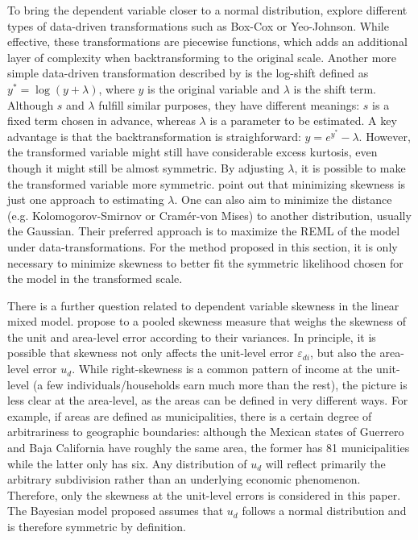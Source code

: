 To bring the dependent variable closer to a normal distribution, \cite{rojas_perilla_data_2020} explore different types of data-driven transformations such as Box-Cox or Yeo-Johnson.
While effective, these transformations are piecewise functions, which adds an additional layer of complexity when backtransforming to the original scale.
Another more simple data-driven transformation described by \cite{rojas_perilla_data_2020} is the log-shift defined as $y^* = \log(y + \lambda)$, where $y$ is the original variable and $\lambda$ is the shift term. Although $s$ and $\lambda$ fulfill similar purposes, they have different meanings: $s$ is a fixed term chosen in advance, whereas $\lambda$ is a parameter to be estimated.
A key advantage is that the backtransformation is straighforward: $y = e^{y^*} - \lambda$.
However, the transformed variable might still have considerable excess kurtosis, even though it might still be almost symmetric.
By adjusting $\lambda$, it is possible to make the transformed variable more symmetric.
\cite{rojas_perilla_data_2020} point out that minimizing skewness is just one approach to estimating $\lambda$.
One can also aim to minimize the distance (e.g. Kolomogorov-Smirnov or Cramér-von Mises) to another distribution, usually the Gaussian.
Their preferred approach is to maximize the REML of the model under data-transformations.
For the method proposed in this section, it is only necessary to minimize skewness to better fit the symmetric likelihood chosen for the model in the transformed scale.

There is a further question related to dependent variable skewness in the linear mixed model.
\cite{rojas_perilla_data_2020} propose to a pooled skewness measure that weighs the skewness of the unit and area-level error according to their variances.
In principle, it is possible that skewness not only affects the unit-level error $\varepsilon_{di}$, but also the area-level error $u_{d}$.
While right-skewness is a common pattern of income at the unit-level (a few individuals/households earn much more than the rest), the picture is less clear at the area-level, as the areas can be defined in very different ways.
For example, if areas are defined as municipalities, there is a certain degree of arbitrariness to geographic boundaries:
although the Mexican states of Guerrero and Baja California have roughly the same area, the former has 81 municipalities while the latter only has six.
Any distribution of $u_d$ will reflect primarily the arbitrary subdivision rather than an underlying economic phenomenon.
Therefore, only the skewness at the unit-level errors is considered in this paper.
The Bayesian model proposed assumes that $u_d$ follows a normal distribution and is therefore symmetric by definition.

